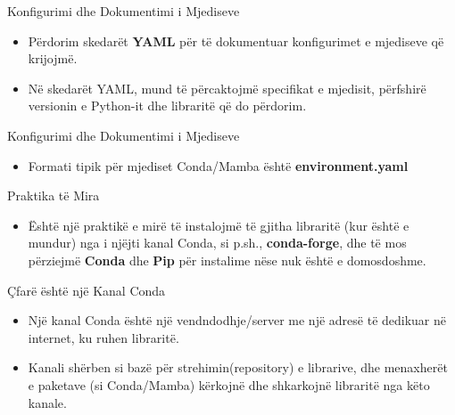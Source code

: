 \documentclass[
  ignorenonframetext,
]{beamer}
\providecommand{\tightlist}{%
  \setlength{\itemsep}{0pt}\setlength{\parskip}{0pt}}
\begin{document}
\begin{frame}{Konfigurimi dhe Dokumentimi i Mjediseve}
\protect\hypertarget{konfigurimi-dhe-dokumentimi-i-mjediseve}{}
\begin{itemize}
\item
  Përdorim skedarët \textbf{YAML} për të dokumentuar konfigurimet e
  mjediseve që krijojmë.
\item
  Në skedarët YAML, mund të përcaktojmë specifikat e mjedisit, përfshirë
  versionin e Python-it dhe libraritë që do përdorim.
\end{itemize}
\end{frame}

\begin{frame}{Konfigurimi dhe Dokumentimi i Mjediseve}
\protect\hypertarget{konfigurimi-dhe-dokumentimi-i-mjediseve-1}{}
\begin{itemize}
\tightlist
\item
  Formati tipik për mjediset Conda/Mamba është \textbf{environment.yaml}
\end{itemize}

\href{./Figs/enviroment.png}{}
\end{frame}

\begin{frame}{Praktika të Mira}
\protect\hypertarget{praktika-tuxeb-mira}{}
\begin{itemize}
\tightlist
\item
  Është një praktikë e mirë të instalojmë të gjitha libraritë (kur është
  e mundur) nga i njëjti kanal Conda, si p.sh., \textbf{conda-forge},
  dhe të mos përziejmë \textbf{Conda} dhe \textbf{Pip} për instalime
  nëse nuk është e domosdoshme.
\end{itemize}
\end{frame}

\begin{frame}{Çfarë është një Kanal Conda}
\protect\hypertarget{uxe7faruxeb-uxebshtuxeb-njuxeb-kanal-conda}{}
\begin{itemize}
\item
  Një kanal Conda është një vendndodhje/server me një adresë të dedikuar
  në internet, ku ruhen libraritë.
\item
  Kanali shërben si bazë për strehimin(repository) e librarive, dhe
  menaxherët e paketave (si Conda/Mamba) kërkojnë dhe shkarkojnë
  libraritë nga këto kanale.
\end{itemize}
\end{frame}
\end{document}
